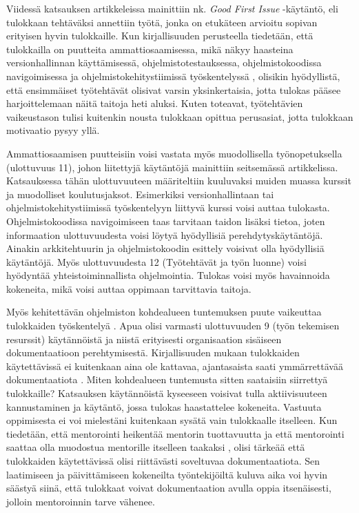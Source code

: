 \documentclass[utf8]{gradu3}
\begin{document}
Viidessä katsauksen artikkeleissa mainittiin nk. \textit{Good First Issue} -käytäntö, eli tulokkaan tehtäväksi annettiin työtä, jonka on etukäteen arvioitu sopivan erityisen hyvin tulokkaille. Kun kirjallisuuden perusteella tiedetään, että tulokkailla on puutteita ammattiosaamisessa, mikä näkyy haasteina versionhallinnan käyttämisessä, ohjelmistotestauksessa, ohjelmistokoodissa navigoimisessa ja ohjelmistokehitystiimissä työskentelyssä %
\parencites%
    {craig-ym-2018}%
    {matturro-ym-2017}%
    {dagenais-ym-2010}%
    {begel-simon-2008}%
\relax
% 
, olisikin hyödyllistä, että ensimmäiset työtehtävät olisivat varsin yksinkertaisia, jotta tulokas pääsee harjoittelemaan näitä taitoja heti aluksi. Kuten \textcite{ju-ym-2021} toteavat, työtehtävien vaikeustason tulisi kuitenkin nousta tulokkaan opittua perusasiat, jotta tulokkaan motivaatio pysyy yllä. 

Ammattiosaamisen puutteisiin voisi vastata myös muodollisella työnopetuksella (ulottuvuus 11), johon liitettyjä käytäntöjä mainittiin seitsemässä artikkelissa. Katsauksessa tähän ulottuvuuteen määriteltiin kuuluvaksi muiden muassa kurssit ja muodolliset koulutusjaksot. Esimerkiksi versionhallintaan tai ohjelmistokehitystiimissä työskentelyyn liittyvä kurssi voisi auttaa tulokasta. Ohjelmistokoodissa navigoimiseen taas tarvitaan taidon lisäksi tietoa, joten informaation ulottuvuudesta voisi löytyä hyödyllisiä perehdytyskäytäntöjä. Ainakin arkkitehtuurin ja ohjelmistokoodin esittely voisivat olla hyödyllisiä käytäntöjä. Myös ulottuvuudesta 12 (Työtehtävät ja työn luonne) voisi hyödyntää yhteistoiminnallista ohjelmointia. Tulokas voisi myös havainnoida kokeneita, mikä voisi auttaa oppimaan tarvittavia taitoja.

Myös kehitettävän ohjelmiston kohdealueen tuntemuksen puute vaikeuttaa tulokkaiden työskentelyä %
\parencites%
    {matturro-ym-2017}%
    {dagenais-ym-2010}%
\relax
% 
. Apua olisi varmasti ulottuvuuden 9 (työn tekemisen resurssit) käytännöistä ja niistä erityisesti organisaation sisäiseen dokumentaatioon perehtymisestä. Kirjallisuuden mukaan tulokkaiden käytettävissä ei kuitenkaan aina ole kattavaa, ajantasaista saati ymmärrettävää dokumentaatiota %
\parencites%
    {matturro-ym-2017}%
    {dagenais-ym-2010}%
    {begel-simon-2008}%
\relax
%
. Miten kohdealueen tuntemusta sitten saataisiin siirrettyä tulokkaille? Katsauksen käytännöistä kyseeseen voisivat tulla aktiivisuuteen kannustaminen ja käytäntö, jossa tulokas haastattelee kokeneita. Vastuuta oppimisesta ei voi mielestäni kuitenkaan sysätä vain tulokkaalle itselleen. Kun tiedetään, että mentorointi heikentää mentorin tuottavuutta \parencite{medeiros-2021} ja että mentorointi saattaa olla muodostua mentorille itselleen taakaksi \parencite{viviani-murphy-2019}, olisi tärkeää että tulokkaiden käytettävissä olisi riittävästi soveltuvaa dokumentaatiota. Sen laatimiseen ja päivittämiseen kokeneilta työntekijöiltä kuluva aika voi hyvin säästyä siinä, että tulokkaat voivat dokumentaation avulla oppia itsenäisesti, jolloin mentoroinnin tarve vähenee.
\end{document}
